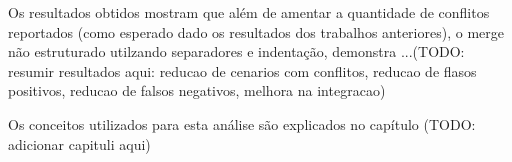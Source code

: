Os resultados obtidos mostram que além de amentar a quantidade de conflitos reportados (como esperado dado os resultados dos trabalhos anteriores), 
o merge não estruturado utilzando separadores e indentação, demonstra ...(TODO: resumir resultados aqui: reducao de cenarios com conflitos, reducao de flasos positivos, reducao de falsos negativos, melhora na integracao)

Os conceitos utilizados para esta análise são explicados no capítulo (TODO: adicionar capituli aqui)
